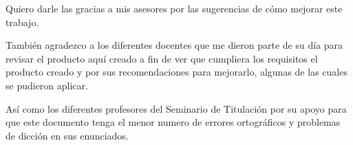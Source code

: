 \begin{thanks}



Quiero darle las gracias a mis asesores por las sugerencias de cómo mejorar este trabajo. 

También agradezco a los diferentes docentes que me dieron parte de su día para revisar el producto aquí creado a fin de ver que cumpliera los requisitos el producto creado y por sus recomendaciones para mejorarlo, algunas de las cuales se pudieron aplicar. 

Así como los diferentes profesores del Seminario de Titulación por su apoyo para que este documento tenga el menor numero de errores ortográficos y problemas de dicción en sus enunciados.

\end{thanks}
